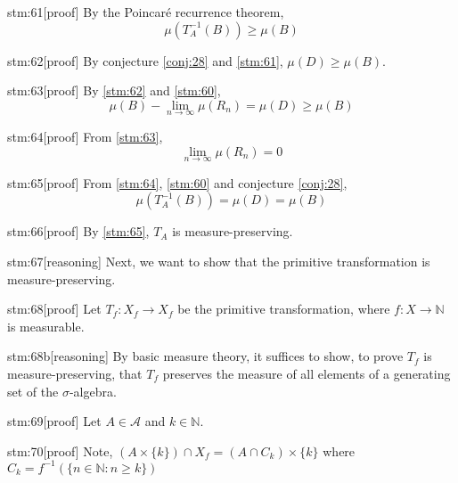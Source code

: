 \documentclass{article}
\begin{document}
\begin{stm}{stm:61}[proof]
By the Poincaré recurrence theorem, 
\[
\mu(T_A^{-1}(B)) \ge \mu(B)
\]
\end{stm}

\begin{stm}{stm:62}[proof]
By conjecture \ref{conj:28} and \ref{stm:61}, $\mu(D) \ge \mu(B)$.
\end{stm}

\begin{stm}{stm:63}[proof]
By \ref{stm:62} and \ref{stm:60}, 
\[
\mu(B) - \lim_{n \to \infty} \mu(R_n) = \mu(D) \ge \mu(B)
\]
\end{stm}

\begin{stm}{stm:64}[proof]
From \ref{stm:63}, 
\[
\lim_{n \to \infty} \mu(R_n) = 0
\]
\end{stm}

\begin{stm}{stm:65}[proof]
From \ref{stm:64}, \ref{stm:60} and conjecture \ref{conj:28},
\[
\mu(T_A^{-1}(B)) = \mu(D) = \mu(B)
\]
\end{stm}

\begin{stm}{stm:66}[proof]
By \ref{stm:65}, $T_A$ is measure-preserving.
\end{stm}

\begin{stm}{stm:67}[reasoning]
Next, we want to show that the primitive transformation is measure-preserving.
\end{stm}

\begin{stm}{stm:68}[proof]
Let $T_f : X_f \to X_f$ be the primitive transformation, where $f : X \to \mathbb{N}$ is measurable.
\end{stm}

\begin{stm}{stm:68b}[reasoning]
By basic measure theory, it suffices to show, to prove $T_f$ is measure-preserving, that $T_f$ preserves the measure of all elements of a generating set of the $\sigma$-algebra.
\end{stm}

\begin{stm}{stm:69}[proof]
Let $A \in \mathcal{A}$ and $k \in \mathbb{N}$.
\end{stm}

\begin{stm}{stm:70}[proof]
Note, $(A \times \{k\}) \cap X_f = (A \cap C_k) \times \{k\}$ where $C_k = f^{-1}(\{n \in \mathbb{N} : n \ge k\})$
\end{stm}
\end{document}
